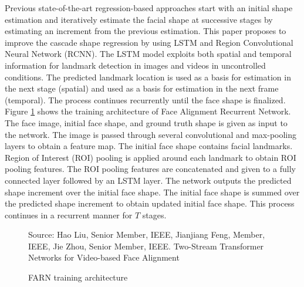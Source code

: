 \documentclass{llncs}
\begin{document}
Previous state-of-the-art regression-based approaches start with an initial shape estimation and iteratively estimate the facial shape at successive stages by estimating an increment from the previous estimation. This paper proposes to improve the cascade shape regression by using LSTM and Region Convolutional Neural Network (RCNN). The LSTM model exploits both spatial and temporal information for landmark detection in images and videos in uncontrolled conditions. The predicted landmark location is used as a basis for estimation in the next stage (spatial) and used as a basis for estimation in the next frame (temporal). The process continues recurrently until the face shape is finalized. 
Figure \ref{farn_training} shows the training architecture of Face Alignment Recurrent Network. The face image, initial face shape, and ground truth shape is given as input to the network. The image is passed through several convolutional and max-pooling layers to obtain a feature map. The initial face shape contains facial landmarks. Region of Interest (ROI) pooling is applied around each landmark to obtain ROI pooling features. The ROI pooling features are concatenated and given to a fully connected layer followed by an LSTM layer. The network outputs the predicted shape increment over the initial face shape. The initial face shape is summed over the predicted shape increment to obtain updated initial face shape. This process continues in a recurrent manner for $T$ stages.

\begin{figure}
%
{Source: Hao Liu, Senior Member, IEEE, Jianjiang Feng, Member, IEEE, Jie Zhou, Senior Member, IEEE. Two-Stream Transformer Networks for Video-based Face Alignment}
\caption{FARN training architecture}
\label{farn_training}
\end{figure}
\end{document}

